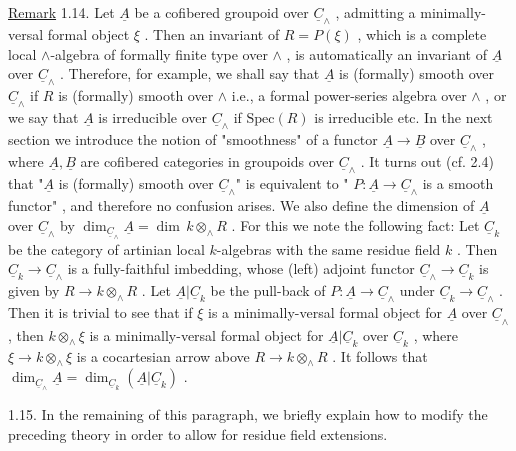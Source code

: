 \underline{Remark} 1.14.  Let  $\underline{A}$  be a cofibered groupoid over  $\underline{C}_\wedge$  , admitting a minimally-versal formal object  $\xi$  . Then an invariant of  $R = P(\xi)$  , which is a complete local  $\wedge$-algebra of formally finite type over  $\wedge$  , is automatically an invariant of  $\underline{A}$  over  $\underline{C}_\wedge$  . Therefore, for example, we shall say that  $\underline{A}$  is (formally) smooth over  $\underline{C}_\wedge$  if  $R$  is (formally) smooth over  $\wedge$  i.e., a formal power-series algebra over  $\wedge$  , or we say that  $\underline{A}$  is irreducible over  $\underline{C}_\wedge$  if  $\mathrm{Spec}(R)$  is irreducible etc. In the next section we introduce the notion of  "smoothness"  of a functor  $\underline{A} \to \underline{B}$  over  $\underline{C}_\wedge$  , where  $\underline{A}, \underline{B}$  are cofibered categories in groupoids over  $\underline{C}_\wedge$  . It turns out (cf. 2.4) that  "$\underline{A}$  is (formally) smooth over  $\underline{C}_\wedge$"  is equivalent to  " $P : \underline{A} \to \underline{C}_\wedge$  is a smooth functor"  , and therefore no confusion arises. We also define the dimension of  $\underline{A}$  over  $\underline{C}_\wedge$  by  $\dim_{\underline{C}_\wedge} \underline{A} = \dim\, k \otimes_\wedge R$  . For this we note the following fact:  Let  $\underline{C}_k$  be the category of artinian local $k$-algebras with the same residue field  $k$  . Then  $\underline{C}_k \to \underline{C}_\wedge$  is a fully-faithful imbedding, whose (left) adjoint functor  $\underline{C}_\wedge \to \underline{C}_k$  is given by  $R \to k \otimes_\wedge R$  . Let $\underline{A}|\underline{C}_k$  be the pull-back of  $P : \underline{A} \to \underline{C}_\wedge$  under  $\underline{C}_k \to \underline{C}_\wedge$  . Then it is trivial to see that if  $\xi$  is a minimally-versal formal object for  $\underline{A}$  over  $\underline{C}_\wedge$  , then  $k \otimes_\wedge \xi$ is a minimally-versal formal object for  $\underline{A}|\underline{C}_k$  over  $\underline{C}_k$  , where  $\xi \to k \otimes_\wedge \xi$  is a cocartesian arrow above  $R \to k \otimes_\wedge R$  . It follows that  $\dim_{\underline{C}_\wedge} \underline{A} = \dim_{\underline{C}_k} (\underline{A}|\underline{C}_k)$  .



1.15.  In the remaining of this paragraph, we briefly explain how to modify the preceding theory in order to allow for residue field extensions.

